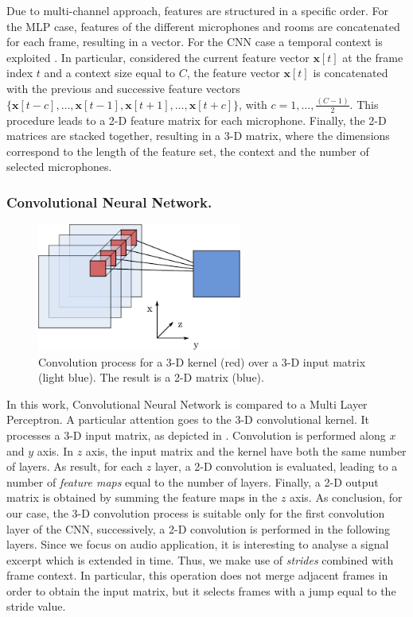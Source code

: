 Due to multi-channel approach, features are structured in a specific order.
For the MLP case, features of the different microphones and rooms are concatenated for each frame, resulting in a vector. For the CNN case a temporal context is exploited \cite{6854054}. In particular, considered the current feature vector $\mathbf{x}[t]$ at the frame index $t$ and a context size equal to $C$, the feature vector $\mathbf{x}[t]$ is concatenated with the previous and successive feature vectors $\{\mathbf{x}[t - c],\ldots,\mathbf{x}[t-1],\mathbf{x}[t+1],\ldots,\mathbf{x}[t + c]\}$, with $c = 1, \dots, \frac{(C-1)}{2}$. This procedure leads to a 2-D feature matrix for each microphone. Finally, the 2-D matrices are stacked together, resulting in a 3-D matrix, where the dimensions correspond to the length of the feature set, the context and the number of selected microphones. 


\subsubsection{Convolutional Neural Network.}
\begin{figure}
	\centering
	\includegraphics[width=0.6\textwidth]{img/3DCNN}
	\caption[CNNs with 3D kernels]{Convolution process for a 3-D kernel (red) over a 3-D input matrix (light blue). The result is a 2-D matrix (blue).}
	\label{fig:3DCNN}
\end{figure}

In this work, Convolutional Neural Network is compared to a Multi Layer Perceptron. 
A particular attention goes to the 3-D convolutional kernel. It processes a 3-D input matrix, as depicted in .
Convolution is performed along $x$ and $y$ axis. In $z$ axis, the input matrix and the kernel have both the same number of layers. As result, for each $z$ layer, a 2-D convolution is evaluated, leading to a number of \textit{feature maps} equal to the number of layers. Finally, a 2-D output matrix is obtained by summing the feature maps in the $z$ axis. 
As conclusion, for our case, the 3-D convolution process is suitable only for the first convolution layer of the CNN, successively, a 2-D convolution is performed in the following layers.
Since we focus on audio application, it is interesting to analyse a signal excerpt which is extended in time. Thus, we make use of \textit{strides} combined with frame context. In particular, this operation does not merge adjacent frames in order to obtain the input matrix, but it selects frames with a jump equal to the stride value. 

